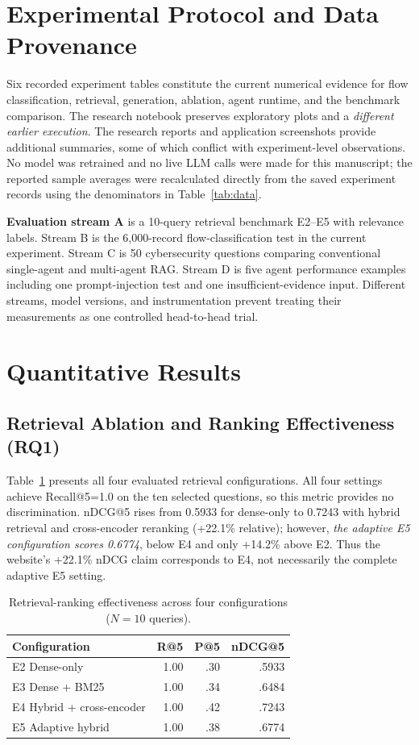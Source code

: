 \documentclass[journal,twoside]{IEEEtran}
\begin{document}
\section{Experimental Protocol and Data Provenance}
Six recorded experiment tables constitute the current numerical evidence for flow classification, retrieval, generation, ablation, agent runtime, and the benchmark comparison. The research notebook preserves exploratory plots and a \emph{different earlier execution}. The research reports and application screenshots provide additional summaries, some of which conflict with experiment-level observations. No model was retrained and no live LLM calls were made for this manuscript; the reported sample averages were recalculated directly from the saved experiment records using the denominators in Table~\ref{tab:data}.

\textbf{Evaluation stream A} is a 10-query retrieval benchmark E2--E5 with relevance labels. Stream B is the 6,000-record flow-classification test in the current experiment. Stream C is 50 cybersecurity questions comparing conventional single-agent and multi-agent RAG. Stream D is five agent performance examples including one prompt-injection test and one insufficient-evidence input. Different streams, model versions, and instrumentation prevent treating their measurements as one controlled head-to-head trial.

\section{Quantitative Results}
\subsection{Retrieval Ablation and Ranking Effectiveness (RQ1)}
Table~\ref{tab:ret} presents all four evaluated retrieval configurations. All four settings achieve Recall@5=1.0 on the ten selected questions, so this metric provides no discrimination. nDCG@5 rises from 0.5933 for dense-only to 0.7243 with hybrid retrieval and cross-encoder reranking (+22.1\% relative); however, \emph{the adaptive E5 configuration scores 0.6774}, below E4 and only +14.2\% above E2. Thus the website's +22.1\% nDCG claim corresponds to E4, not necessarily the complete adaptive E5 setting.
\begin{table}[!t]
\caption{Retrieval-ranking effectiveness across four configurations ($N=10$ queries).}
\label{tab:ret}\centering\footnotesize
\begin{tabular}{p{}rrr}
\toprule Configuration & R@5 & P@5 & nDCG@5\\\midrule
E2 Dense-only & 1.00 & .30 & .5933\\
E3 Dense + BM25 & 1.00 & .34 & .6484\\
E4 Hybrid + cross-encoder & 1.00 & .42 & .7243\\
E5 Adaptive hybrid & 1.00 & .38 & .6774\\\bottomrule
\end{tabular}
\end{table}
\end{document}

